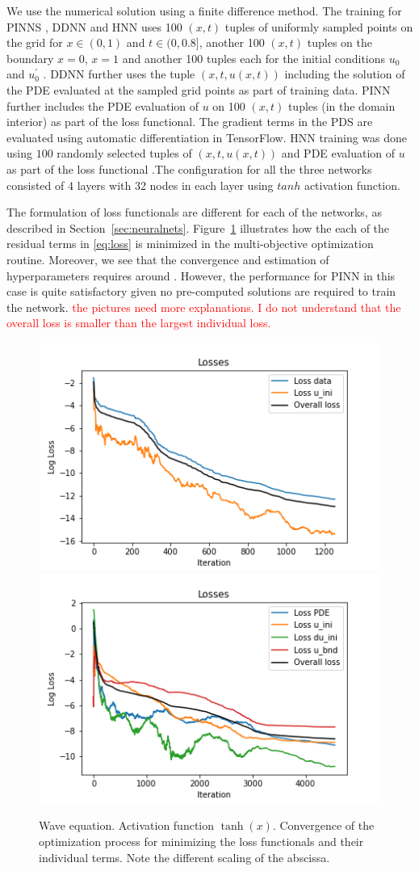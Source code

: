 We use the numerical solution using a finite difference method. The training for PINNS , DDNN and HNN uses 100 $(x,t)$ tuples of uniformly sampled points on the grid for $ x\in (0,1)$ and $t \in (0,0.8]$,  another 100 $(x,t)$ tuples on the boundary $x =0$, $x=1$ and another 100 tuples each for the initial conditions $u_0$ and $u_0^{\prime}$ . DDNN further uses the tuple $(x,t, u(x,t))$ including the solution of the PDE evaluated at the sampled grid points as part of training data. PINN further includes the PDE evaluation of $u$ on 100 $(x,t)$  tuples (in the domain interior) as part of the loss functional. The gradient terms in the PDS are evaluated using automatic differentiation in TensorFlow.  HNN training was done using $100$ randomly selected tuples of $(x, t, u(x,t))$  and PDE evaluation of $u$ as part of the loss functional .The configuration for all the three networks consisted of 4 layers with 32 nodes in each layer using $tanh$ activation function.
\par
The formulation of loss functionals are different for each of the networks, as described in Section~\ref{sec:neuralnets}. Figure~\ref{fig:wave_loss_contributions} illustrates how the each of the residual terms in \eqref{eq:loss} is minimized in the multi-objective optimization routine. Moreover, we see that the convergence and estimation of hyperparameters requires around . However, the performance for PINN  in this case is quite satisfactory given no pre-computed solutions are required to train the network.   
\textcolor{red}{the pictures need more explanations. I do not understand that the overall loss 
is smaller than the largest individual loss.}
\begin{figure}[t!]
\begin{center}
\includegraphics[width=0.45\linewidth]{../Code/B1/losses/combined_losses_reduction_data.png}
\includegraphics[width=0.45\linewidth]{../Code/B1/losses//combined_losses_reduction_PINNs.png}
\end{center}
\caption{Wave equation. Activation function $\tanh(x)$. Convergence of the optimization process 
for minimizing the loss functionals and their individual terms. Note the different scaling of the 
abscissa.}\label{fig:wave_loss_contributions}
\end{figure}



